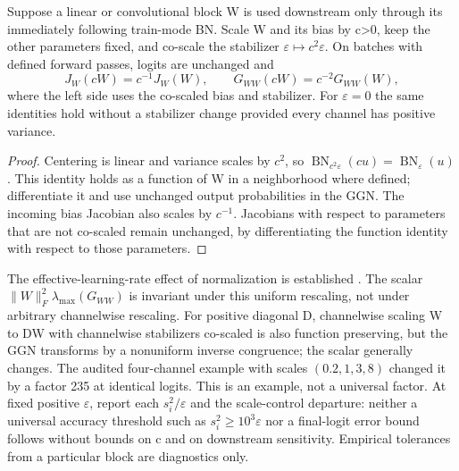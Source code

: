 \begin{proposition}
\label{prop:astra_bn_scale}
Suppose a linear or convolutional block W is used downstream only
through its immediately following train-mode BN. Scale W and its bias
by c>0, keep the other parameters fixed, and co-scale the stabilizer
$\varepsilon\mapsto c^2\varepsilon$. On batches with defined forward
passes, logits are unchanged and
\begin{equation}\label{eq:astra_bn_scale}
 J_W(cW)=c^{-1}J_W(W),\qquad G_{WW}(cW)=c^{-2}G_{WW}(W),
\end{equation}
where the left side uses the co-scaled bias and stabilizer.
For $\varepsilon=0$ the same identities hold without a stabilizer change
provided every channel has positive variance.
\end{proposition}
\begin{proof}
Centering is linear and variance scales by $c^2$, so
$\operatorname{BN}_{c^2\varepsilon}(cu)=\operatorname{BN}_{\varepsilon}(u)$.
This identity holds as a function of W in a neighborhood where defined;
differentiate it and use unchanged output probabilities in the GGN.
The incoming bias Jacobian also scales by $c^{-1}$. Jacobians with
respect to parameters that are not co-scaled remain unchanged, by
differentiating the function identity with respect to those parameters.
\end{proof}
\begin{remark}
The effective-learning-rate effect of normalization is established
\citep{astra_vanlaarhoven2017}. The scalar
$\|W\|_F^2\lambda_{\max}(G_{WW})$ is invariant under this uniform
rescaling, not under arbitrary channelwise rescaling. For positive
diagonal D, channelwise scaling W to DW with channelwise stabilizers
co-scaled is also function preserving, but the GGN transforms by a
nonuniform inverse congruence; the scalar generally changes.
The audited four-channel example with scales $(0.2,1,3,8)$ changed it
by a factor 235 at identical logits. This is an example, not a universal
factor. At fixed positive $\varepsilon$, report each $s_i^2/\varepsilon$
and the scale-control departure: neither a universal accuracy threshold
such as $s_i^2\ge10^3\varepsilon$ nor a final-logit error bound follows
without bounds on c and on downstream sensitivity. Empirical tolerances
from a particular block are diagnostics only.
\end{remark}

